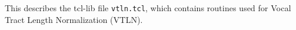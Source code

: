 
\section{}

This describes the tcl-lib  file \texttt{vtln.tcl}, which contains
routines used for Vocal Tract Length Normalization (VTLN).

\subsection{}

\subsection{}

\subsection{}

